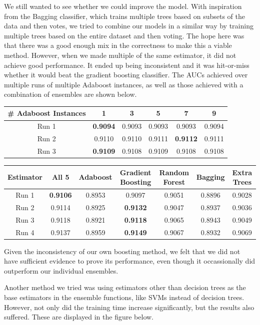 \documentclass{article} %
\begin{document}
We still wanted to see whether we could improve the model.
With inspiration from the Bagging classifier, which trains multiple trees based
on subsets of the data and then votes, we tried to combine our models in a
similar way by training multiple trees based on the entire dataset and then
voting.  The hope here was that there was a good enough mix in the correctness
to make this a viable method.  However, when we made multiple of the same
estimator, it did not achieve good performance.  It ended up being inconsistent
and it was hit-or-miss whether it would beat the gradient boosting classifier.
The AUCs achieved over multiple runs of multiple Adaboost instances, as well as
those achieved with a combination of ensembles are shown below.\\

\begin{tabular}{c|ccccc}
\# Adaboost Instances & 1 & 3 & 5 & 7 & 9\\
\hline
Run 1 & \textbf{0.9094} & 0.9093 & 0.9093 & 0.9093 & 0.9094\\
Run 2 & 0.9110 & 0.9110 & 0.9111 & \textbf{0.9112} & 0.9111\\
Run 3 & \textbf{0.9109} & 0.9108 & 0.9109 & 0.9108 & 0.9108
\end{tabular}

\begin{adjustbox}{width=\textwidth,totalheight=\textheight,keepaspectratio}
\begin{tabular}
{c|cccccc}
Estimator & All 5 & Adaboost & Gradient Boosting & Random Forest & Bagging & Extra Trees\\
\hline
Run 1 & \textbf{0.9106} & 0.8953 & 0.9097 & 0.9051 & 0.8896 & 0.9028\\
Run 2 & 0.9114 & 0.8925 & \textbf{0.9132} & 0.9047 & 0.8937 & 0.9036\\
Run 3 & 0.9118 & 0.8921 & \textbf{0.9118} & 0.9065 & 0.8943 & 0.9049\\
Run 4 & 0.9137 & 0.8959 & \textbf{0.9149} & 0.9067 & 0.8932 & 0.9069
\end{tabular}
\end{adjustbox}

Given the inconsistency of our own boosting method, we felt that we did not have
sufficient evidence to prove its performance, even though it occassionally did
outperform our individual ensembles.

Another method we tried was using estimators other than decision trees as the
base estimators in the ensemble functions, like SVMs instead of decision trees.
However, not only did the training time increase significantly, but the results
also suffered. These are displayed in the figure below.
\end{document}
